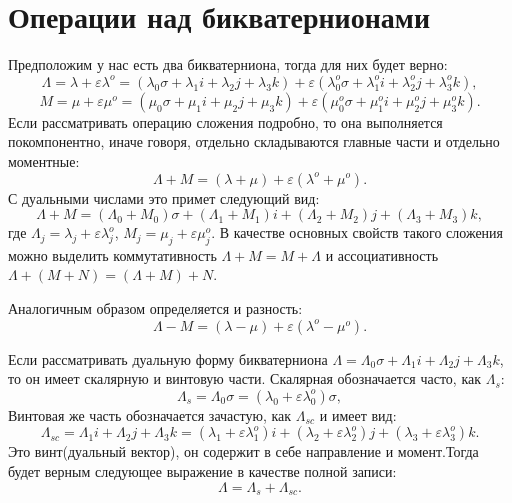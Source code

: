 \section{Операции над бикватернионами}

Предположим у нас есть два бикватерниона, тогда для них будет верно:
\begin{equation*}
    \Lambda = \lambda + \varepsilon \lambda^o = (\lambda_0 \sigma + \lambda_1 i + \lambda_2 j + \lambda_3 k) + \varepsilon(\lambda_0^o \sigma + \lambda_1^o i + \lambda_2^o j + \lambda_3^o k),
\end{equation*}
\begin{equation*}
    M = \mu + \varepsilon \mu^o = (\mu_0 \sigma + \mu_1 i + \mu_2 j + \mu_3 k) + \varepsilon(\mu_0^o \sigma + \mu_1^o i + \mu_2^o j + \mu_3^o k).
\end{equation*}
Если рассматривать операцию сложения подробно, то она выполняется покомпонентно, иначе говоря, отдельно складываются главные части и отдельно моментные:
\begin{equation*}
    \Lambda + M = (\lambda + \mu) + \varepsilon (\lambda^o + \mu^o).
\end{equation*}
С дуальными числами это примет следующий вид:
\begin{equation*}
    \Lambda + M = (\Lambda_0 + M_0)\sigma + (\Lambda_1 + M_1)i + (\Lambda_2 + M_2)j + (\Lambda_3 + M_3)k,
\end{equation*}
где $\Lambda_j = \lambda_j + \varepsilon \lambda_j^o$, $M_j = \mu_j + \varepsilon \mu_j^o$.
В качестве основных свойств такого сложения можно выделить коммутативность $\Lambda + M = M + \Lambda$ и ассоциативность $\Lambda + (M + N) = (\Lambda + M) + N$.

Аналогичным образом определяется и разность:
\begin{equation*}
    \Lambda - M = (\lambda - \mu) + \varepsilon (\lambda^o - \mu^o).
\end{equation*}

Если рассматривать дуальную форму бикватерниона $\Lambda = \Lambda_0 \sigma + \Lambda_1 i + \Lambda_2 j + \Lambda_3 k$, то он имеет скалярную и винтовую части. Скалярная обозначается часто, как $\Lambda_s$:
\begin{equation*}
    \Lambda_s = \Lambda_0 \sigma = (\lambda_0 + \varepsilon \lambda_0^o) \sigma,
\end{equation*}
Винтовая же часть обозначается зачастую, как $\Lambda_{sc}$ и имеет вид:
\begin{equation*}
    \Lambda_{sc} = \Lambda_1 i + \Lambda_2 j + \Lambda_3 k = (\lambda_1 + \varepsilon \lambda_1^o) i + (\lambda_2 + \varepsilon \lambda_2^o) j + (\lambda_3 + \varepsilon \lambda_3^o) k.
\end{equation*}
Это винт(дуальный вектор), он содержит в себе направление и момент.Тогда будет верным следующее выражение в качестве полной записи:
\begin{equation*}
    \Lambda = \Lambda_s + \Lambda_{sc}.
\end{equation*}

